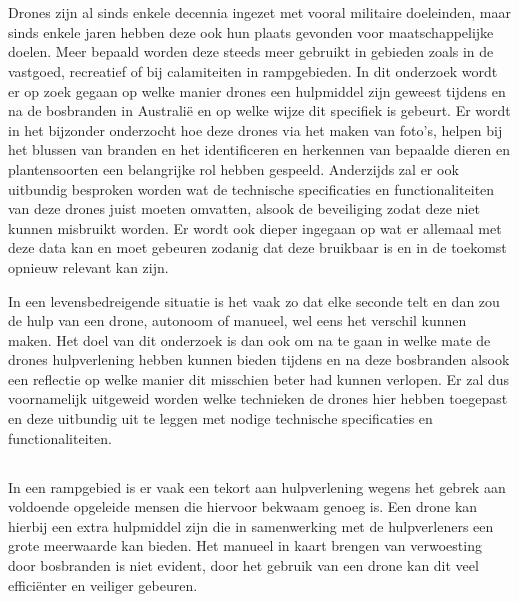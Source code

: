 
\chapter{}
\label{ch:inleiding}

Drones zijn al sinds enkele decennia ingezet met vooral militaire doeleinden, maar sinds enkele jaren hebben deze ook hun plaats gevonden voor maatschappelijke doelen. Meer bepaald worden deze steeds meer gebruikt in gebieden zoals in de vastgoed, recreatief of bij calamiteiten in rampgebieden. In dit onderzoek wordt er op zoek gegaan op welke manier drones een hulpmiddel zijn geweest tijdens en na de bosbranden in Australië en op welke wijze dit specifiek is gebeurt. Er wordt in het bijzonder onderzocht hoe deze drones via het maken van foto's, helpen bij het blussen van branden en het identificeren en herkennen van bepaalde dieren en plantensoorten een belangrijke rol hebben gespeeld. Anderzijds zal er ook uitbundig besproken worden wat de technische specificaties en functionaliteiten van deze drones juist moeten omvatten, alsook de beveiliging zodat deze niet kunnen misbruikt worden. Er wordt ook dieper ingegaan op wat er allemaal met deze data kan en moet gebeuren zodanig dat deze bruikbaar is en in de toekomst opnieuw relevant kan zijn. 

In een levensbedreigende situatie is het vaak zo dat elke seconde telt en dan zou de hulp van een drone, autonoom of manueel, wel eens het verschil kunnen maken. Het doel van dit onderzoek is dan ook om na te gaan in welke mate de drones hulpverlening hebben kunnen bieden tijdens en na deze bosbranden alsook een reflectie op welke manier dit misschien beter had kunnen verlopen. Er zal dus voornamelijk uitgeweid worden welke technieken de drones hier hebben toegepast en deze uitbundig uit te leggen met nodige technische specificaties en functionaliteiten.


\section{}
\label{sec:probleemstelling}

In een rampgebied is er vaak een tekort aan hulpverlening wegens het gebrek aan voldoende opgeleide mensen die hiervoor bekwaam genoeg is. Een drone kan hierbij een extra hulpmiddel zijn die in samenwerking met de hulpverleners een grote meerwaarde kan bieden. Het manueel in kaart brengen van verwoesting door bosbranden is niet evident, door het gebruik van een drone kan dit veel efficiënter en veiliger gebeuren.


